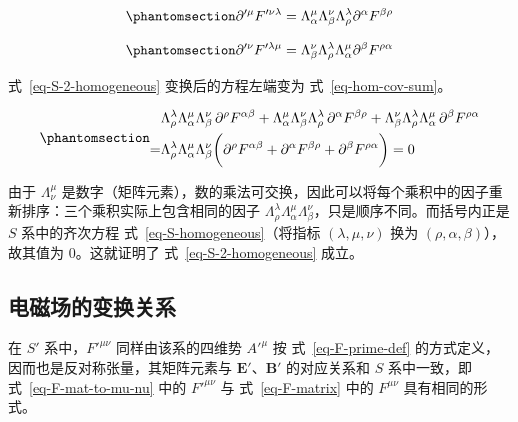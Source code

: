 \documentclass[
  chinese,
  a4paper,
  UTF8,
  12pt,
  oneside,
  openany]{ctexbook}
\theoremstyle{plain}
\theoremstyle{plain}
\theoremstyle{plain}
\theoremstyle{definition}
\theoremstyle{plain}
\theoremstyle{plain}
\theoremstyle{remark}
\begin{document}
\begin{equation}\protect\phantomsection\label{eq-hom-cov-term2}{
\partial'^{\mu}F'^{\nu\lambda} = \Lambda_{\alpha}^{\mu} \Lambda_{\beta}^{\nu}\Lambda_{\rho}^{\lambda}\partial^{\alpha}F^{\beta\rho}
}\end{equation}

\begin{equation}\protect\phantomsection\label{eq-hom-cov-term3}{
\partial'^{\nu}F'^{\lambda\mu} = \Lambda_{\beta}^{\nu} \Lambda_{\rho}^{\lambda}\Lambda_{\alpha}^{\mu}\partial^{\beta}F^{\rho\alpha}
}\end{equation}

式~\ref{eq-S-2-homogeneous} 变换后的方程左端变为
式~\ref{eq-hom-cov-sum}。

\begin{equation}\protect\phantomsection\label{eq-hom-cov-sum}{
\begin{aligned}
& \Lambda_{\rho}^{\lambda} \Lambda_{\alpha}^{\mu} \Lambda_{\beta}^{\nu}\, \partial^{\rho}F^{\alpha\beta} + \Lambda_{\alpha}^{\mu} \Lambda_{\beta}^{\nu} \Lambda_{\rho}^{\lambda}\, \partial^{\alpha}F^{\beta\rho} + \Lambda_{\beta}^{\nu} \Lambda_{\rho}^{\lambda} \Lambda_{\alpha}^{\mu}\, \partial^{\beta}F^{\rho\alpha} \\
=& \Lambda_{\rho}^{\lambda} \Lambda_{\alpha}^{\mu} \Lambda_{\beta}^{\nu}
\biggl(\partial^{\rho}F^{\alpha\beta}
+ \partial^{\alpha}F^{\beta\rho}
+ \partial^{\beta}F^{\rho\alpha} \biggr) = 0
\end{aligned}
}\end{equation}

由于 \(\Lambda_{\nu}^{\mu}\)
是数字（矩阵元素），数的乘法可交换，因此可以将每个乘积中的因子重新排序：三个乘积实际上包含相同的因子
\(\Lambda_{\rho}^{\lambda} \Lambda_{\alpha}^{\mu}\Lambda_{\beta}^{\nu}\)，只是顺序不同。而括号内正是
\(S\) 系中的齐次方程 式~\ref{eq-S-homogeneous}（将指标
\((\lambda,\mu,\nu)\) 换为 \((\rho,\alpha,\beta)\)），故其值为
0。这就证明了 式~\ref{eq-S-2-homogeneous} 成立。

\subsection{电磁场的变换关系}\label{ux7535ux78c1ux573aux7684ux53d8ux6362ux5173ux7cfb}

在 \(S'\) 系中，\(F'^{\mu\nu}\) 同样由该系的四维势 \(A'^{\mu}\) 按
式~\ref{eq-F-prime-def} 的方式定义，因而也是反对称张量，其矩阵元素与
\(\mathbf{E}'\)、\(\mathbf{B}'\) 的对应关系和 \(S\) 系中一致，即
式~\ref{eq-F-mat-to-mu-nu} 中的 \(F'^{\mu\nu}\) 与 式~\ref{eq-F-matrix}
中的 \(F^{\mu\nu}\) 具有相同的形式。
\end{document}
